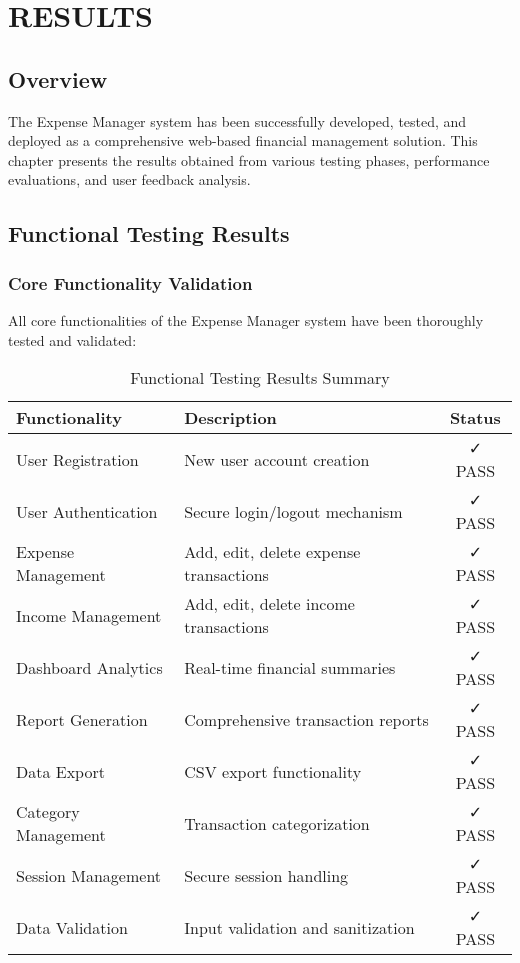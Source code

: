 \chapter{RESULTS}

\section{Overview}

The Expense Manager system has been successfully developed, tested, and deployed as a comprehensive web-based financial management solution. This chapter presents the results obtained from various testing phases, performance evaluations, and user feedback analysis.

\section{Functional Testing Results}

\subsection{Core Functionality Validation}

All core functionalities of the Expense Manager system have been thoroughly tested and validated:

\begin{table}[h]
\centering
\begin{tabular}{|l|l|c|}
\hline
\textbf{Functionality} & \textbf{Description} & \textbf{Status} \\
\hline
User Registration & New user account creation & ✓ PASS \\
\hline
User Authentication & Secure login/logout mechanism & ✓ PASS \\
\hline
Expense Management & Add, edit, delete expense transactions & ✓ PASS \\
\hline
Income Management & Add, edit, delete income transactions & ✓ PASS \\
\hline
Dashboard Analytics & Real-time financial summaries & ✓ PASS \\
\hline
Report Generation & Comprehensive transaction reports & ✓ PASS \\
\hline
Data Export & CSV export functionality & ✓ PASS \\
\hline
Category Management & Transaction categorization & ✓ PASS \\
\hline
Session Management & Secure session handling & ✓ PASS \\
\hline
Data Validation & Input validation and sanitization & ✓ PASS \\
\hline
\end{tabular}
\caption{Functional Testing Results Summary}
\end{table}

